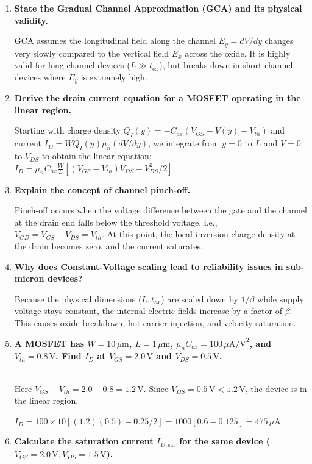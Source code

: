 \documentclass[12pt,a4paper]{article}
\newcommand{\Q}[1]{\textbf{#1}\par\noindent\ignorespaces}
\begin{document}
\begin{tcolorbox}[exambox, title={\textbf{Frequently Asked / Viva Questions}}]
\begin{enumerate}[topsep=0pt, label=\textbf{Q\arabic*.}, itemsep=5pt]
  \item \Q{State the Gradual Channel Approximation (GCA) and its physical validity.}
    GCA assumes the longitudinal field along the channel $E_y = dV/dy$ changes very slowly compared to the vertical field $E_x$ across the oxide. It is highly valid for long-channel devices ($L \gg t_{ox}$), but breaks down in short-channel devices where $E_y$ is extremely high.
  \item \Q{Derive the drain current equation for a MOSFET operating in the linear region.}
    Starting with charge density $Q_I(y) = -C_{ox}(V_{GS} - V(y) - V_{th})$ and current $I_D = W Q_I(y) \mu_n (dV/dy)$, we integrate from $y=0$ to $L$ and $V=0$ to $V_{DS}$ to obtain the linear equation: $I_D = \mu_n C_{ox} \frac{W}{L} [(V_{GS} - V_{th})V_{DS} - V_{DS}^2 / 2]$.
  \item \Q{Explain the concept of channel pinch-off.}
    Pinch-off occurs when the voltage difference between the gate and the channel at the drain end falls below the threshold voltage, i.e., $V_{GD} = V_{GS} - V_{DS} = V_{th}$. At this point, the local inversion charge density at the drain becomes zero, and the current saturates.
  \item \Q{Why does Constant-Voltage scaling lead to reliability issues in sub-micron devices?}
    Because the physical dimensions ($L, t_{ox}$) are scaled down by $1/\beta$ while supply voltage stays constant, the internal electric fields increase by a factor of $\beta$. This causes oxide breakdown, hot-carrier injection, and velocity saturation.
  \item \Q{A MOSFET has $W = 10\,\mu\text{m}$, $L = 1\,\mu\text{m}$, $\mu_n C_{ox} = 100\,\mu\text{A/V}^2$, and $V_{th} = 0.8\,\text{V}$. Find $I_D$ at $V_{GS} = 2.0\,\text{V}$ and $V_{DS} = 0.5\,\text{V}$.}\\
    Here $V_{GS} - V_{th} = 2.0 - 0.8 = 1.2\,\text{V}$. Since $V_{DS} = 0.5\,\text{V} < 1.2\,\text{V}$, the device is in the linear region.\par
    $I_D = 100 \times 10 \left[ (1.2)(0.5) - 0.25/2 \right] = 1000 \left[ 0.6 - 0.125 \right] = 475\,\mu\text{A}$.
  \item \Q{Calculate the saturation current $I_{D,\text{sat}}$ for the same device ($V_{GS} = 2.0\,\text{V}, V_{DS} = 1.5\,\text{V}$).}\\

\end{enumerate}
\end{tcolorbox}
\end{document}
